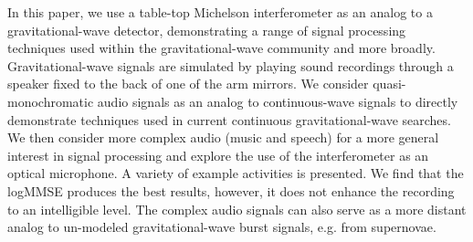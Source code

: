 \documentclass[paper-main.tex]{subfiles}
\begin{document}
In this paper, we use a table-top Michelson interferometer as an analog to a gravitational-wave detector, demonstrating a range of signal processing techniques used within the gravitational-wave community and more broadly. 
Gravitational-wave signals are simulated by playing sound recordings through a speaker fixed to the back of one of the arm mirrors. 
We consider quasi-monochromatic audio signals as an analog to continuous-wave signals to directly demonstrate techniques used in current continuous gravitational-wave searches.
We then consider more complex audio (music and speech) for a more general interest in signal processing and explore the use of the interferometer as an optical microphone. 
A variety of example activities is presented. 
We find that the logMMSE produces the best results, however, it does not enhance the recording to an intelligible level. 
The complex audio signals can also serve as a more distant analog to un-modeled gravitational-wave burst signals, e.g. from supernovae. 
\end{document}
